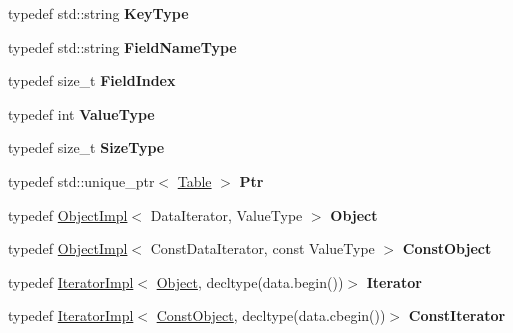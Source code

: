 \begin{DoxyCompactItemize}
\item 
\mbox{\label{class_table_a7ec536bb39802e0f446dad42e08d4fdf}} 
typedef std\+::string {\bfseries Key\+Type}
\item 
\mbox{\label{class_table_a3535e31e3b4cb2fef2b18ff98657fa85}} 
typedef std\+::string {\bfseries Field\+Name\+Type}
\item 
\mbox{\label{class_table_a3b5004cab41ef3fcf8708aefd44228b6}} 
typedef size\+\_\+t {\bfseries Field\+Index}
\item 
\mbox{\label{class_table_aaa438add915f9459416dab957f52ee63}} 
typedef int {\bfseries Value\+Type}
\item 
\mbox{\label{class_table_af5796c55702b4b5e3eeb35670d9b242a}} 
typedef size\+\_\+t {\bfseries Size\+Type}
\item 
\mbox{\label{class_table_a15892db3d57f25fafe199f593614ffdf}} 
typedef std\+::unique\+\_\+ptr$<$ \hyperlink{class_table}{Table} $>$ {\bfseries Ptr}
\item 
\mbox{\label{class_table_a930877dd111fb5403afff7c400c25925}} 
typedef \hyperlink{class_table_1_1_object_impl}{Object\+Impl}$<$ Data\+Iterator, Value\+Type $>$ {\bfseries Object}
\item 
\mbox{\label{class_table_adbcee28c19fcaa0904e71f2d76b80c31}} 
typedef \hyperlink{class_table_1_1_object_impl}{Object\+Impl}$<$ Const\+Data\+Iterator, const Value\+Type $>$ {\bfseries Const\+Object}
\item 
\mbox{\label{class_table_a41a3e845dfe45869c641cc564a70b328}} 
typedef \hyperlink{class_table_1_1_iterator_impl}{Iterator\+Impl}$<$ \hyperlink{class_table_1_1_object_impl}{Object}, decltype(data.\+begin())$>$ {\bfseries Iterator}
\item 
\mbox{\label{class_table_a745f59742a52fe738da52323c23dbe29}} 
typedef \hyperlink{class_table_1_1_iterator_impl}{Iterator\+Impl}$<$ \hyperlink{class_table_1_1_object_impl}{Const\+Object}, decltype(data.\+cbegin())$>$ {\bfseries Const\+Iterator}
\end{DoxyCompactItemize}
